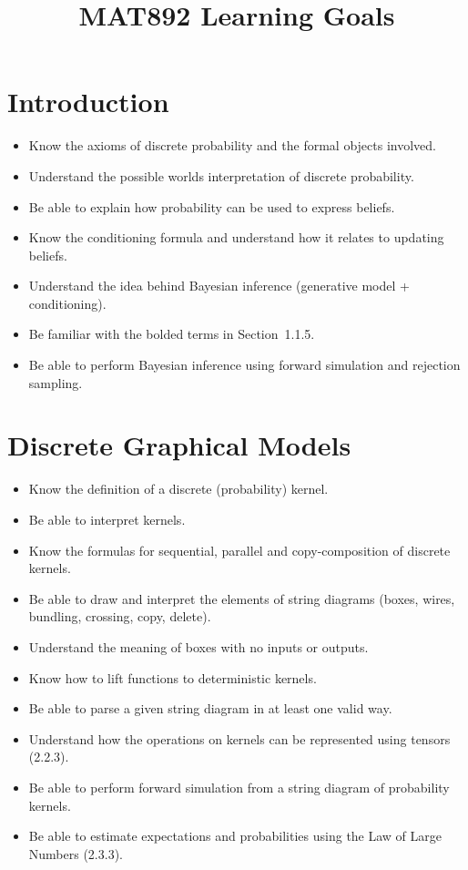 \documentclass[11pt, a4paper]{article}
\title{\LARGE\bfseries MAT892 Learning Goals}
\author{}
\date{}
\begin{document}
\maketitle

\section{Introduction}

\begin{itemize}
  \item Know the axioms of discrete probability and the formal objects involved.
  \item Understand the possible worlds interpretation of discrete probability.
  \item Be able to explain how probability can be used to express beliefs.
  \item Know the conditioning formula and understand how it relates to updating beliefs.
  \item Understand the idea behind Bayesian inference (generative model + conditioning).
  \item Be familiar with the bolded terms in Section~1.1.5.
  \item Be able to perform Bayesian inference using forward simulation and rejection sampling.
\end{itemize}

\section{Discrete Graphical Models}

\begin{itemize}
  \item Know the definition of a discrete (probability) kernel.
  \item Be able to interpret kernels.
  \item Know the formulas for sequential, parallel and copy-composition of discrete kernels.
  \item Be able to draw and interpret the elements of string diagrams (boxes, wires, bundling, crossing, copy, delete).
  \item Understand the meaning of boxes with no inputs or outputs.
  \item Know how to lift functions to deterministic kernels.
  \item Be able to parse a given string diagram in at least one valid way.
  \item Understand how the operations on kernels can be represented using tensors (2.2.3).
  \item Be able to perform forward simulation from a string diagram of probability kernels.
  \item Be able to estimate expectations and probabilities using the Law of Large Numbers (2.3.3).
\end{itemize}
\end{document}
